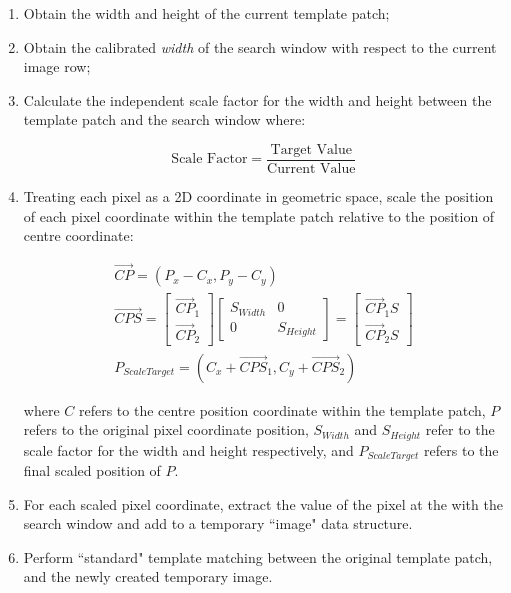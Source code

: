\begin{enumerate}
	\item Obtain the width and height of the current template patch;
	\item Obtain the calibrated \textit{width} of the search window with respect to the current image row;
	\item Calculate the independent scale factor for the width and height between the template patch and the search window where:
	
	\begin{equation}
		\text{Scale Factor} = \frac{\text{Target Value}}{\text{Current Value}}
	\end{equation}
	 
	\item Treating each pixel as a 2D coordinate in geometric space, scale the position of each pixel coordinate within the template patch relative to the position of centre coordinate:

	\begin{gather} 
 \vec{CP} = (P_{x} - C_{x}, P_{y} - C_{y})
 \\
\vec{CPS} = \begin{bmatrix} \vec{CP}_{1} \\ \vec{CP}_{2} \end{bmatrix}\begin{bmatrix} S_{Width} & 0 \\ 0 & S_{Height} \end{bmatrix} = \begin{bmatrix} \vec{CP}_{1}S \\ \vec{CP}_{2}S \end{bmatrix}
\\
P_{ScaleTarget} = (C_{x} + \vec{CPS}_{1}, C_{y} + \vec{CPS}_{2}) 
\end{gather} 
		
where $C$ refers to the centre position coordinate within the template patch, $P$ refers to the original pixel coordinate position, $S_{Width}$ and $S_{Height}$ refer to the scale factor for the width and height respectively, and $P_{ScaleTarget}$ refers to the final scaled position of $P$. 

\item For each scaled pixel coordinate, extract the value of the pixel at the  with the search window and add to a temporary ``image" data structure.

\item Perform ``standard" template matching between the original template patch, and the newly created temporary image.
	
\end{enumerate}

